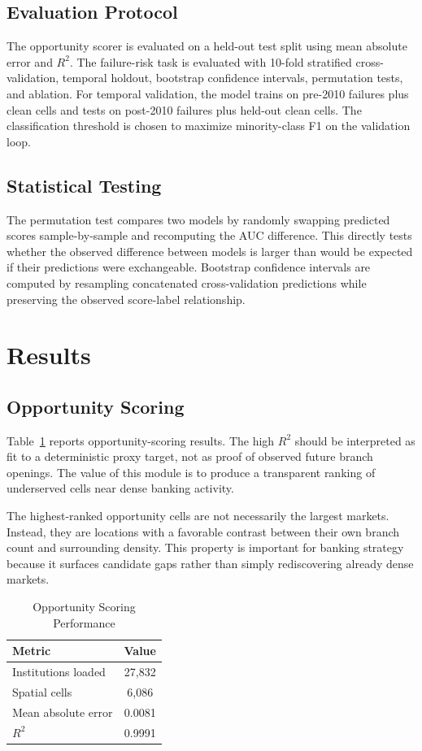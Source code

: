 \documentclass[conference]{IEEEtran}
\begin{document}
\subsection{Evaluation Protocol}
The opportunity scorer is evaluated on a held-out test split using mean
absolute error and $R^2$. The failure-risk task is evaluated with 10-fold
stratified cross-validation, temporal holdout, bootstrap confidence
intervals, permutation tests, and ablation. For temporal validation, the
model trains on pre-2010 failures plus clean cells and tests on post-2010
failures plus held-out clean cells. The classification threshold is chosen
to maximize minority-class F1 on the validation loop.

\subsection{Statistical Testing}
The permutation test compares two models by randomly swapping predicted
scores sample-by-sample and recomputing the AUC difference. This directly
tests whether the observed difference between models is larger than would
be expected if their predictions were exchangeable. Bootstrap confidence
intervals are computed by resampling concatenated cross-validation
predictions while preserving the observed score-label relationship.

\section{Results}
\subsection{Opportunity Scoring}
Table~\ref{tab:opportunity_metrics} reports opportunity-scoring results.
The high $R^2$ should be interpreted as fit to a deterministic proxy target,
not as proof of observed future branch openings. The value of this module is
to produce a transparent ranking of underserved cells near dense banking
activity.

The highest-ranked opportunity cells are not necessarily the largest
markets. Instead, they are locations with a favorable contrast between
their own branch count and surrounding density. This property is important
for banking strategy because it surfaces candidate gaps rather than simply
rediscovering already dense markets.

\begin{table}[t]
\caption{Opportunity Scoring Performance}
\label{tab:opportunity_metrics}
\centering
\begin{tabular}{lc}
\toprule
Metric & Value \\
\midrule
Institutions loaded & 27,832 \\
Spatial cells & 6,086 \\
Mean absolute error & 0.0081 \\
$R^2$ & 0.9991 \\
\bottomrule
\end{tabular}
\end{table}
\end{document}
